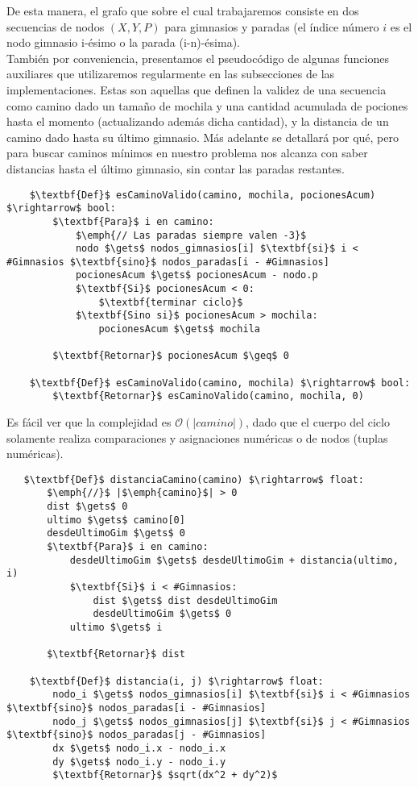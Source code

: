   De esta manera, el grafo que sobre el cual trabajaremos consiste en dos secuencias de nodos $(X, Y, P)$ para gimnasios y paradas (el índice número $i$ es el nodo gimnasio i-ésimo o la parada (i-n)-ésima).
   \\

   También por conveniencia, presentamos el pseudocódigo de algunas funciones auxiliares que utilizaremos regularmente en las subsecciones de las implementaciones. Estas son aquellas que definen la validez de una secuencia como camino dado un tamaño de mochila y una cantidad acumulada de pociones hasta el momento (actualizando además dicha cantidad), y la distancia de un camino dado hasta su último gimnasio. Más adelante se detallará por qué, pero para buscar caminos mínimos en nuestro problema nos alcanza con saber distancias hasta el último gimnasio, sin contar las paradas restantes.
   \\

   \begin{lstlisting}
    $\textbf{Def}$ esCaminoValido(camino, mochila, pocionesAcum) $\rightarrow$ bool:
        $\textbf{Para}$ i en camino:
            $\emph{// Las paradas siempre valen -3}$
            nodo $\gets$ nodos_gimnasios[i] $\textbf{si}$ i < #Gimnasios $\textbf{sino}$ nodos_paradas[i - #Gimnasios]
            pocionesAcum $\gets$ pocionesAcum - nodo.p
            $\textbf{Si}$ pocionesAcum < 0:
                $\textbf{terminar ciclo}$
            $\textbf{Sino si}$ pocionesAcum > mochila:
                pocionesAcum $\gets$ mochila

        $\textbf{Retornar}$ pocionesAcum $\geq$ 0

    $\textbf{Def}$ esCaminoValido(camino, mochila) $\rightarrow$ bool:
        $\textbf{Retornar}$ esCaminoValido(camino, mochila, 0)
   \end{lstlisting}

   Es fácil ver que la complejidad es $\mathcal{O}(|camino|)$, dado que el cuerpo del ciclo solamente realiza comparaciones y asignaciones numéricas o de nodos (tuplas numéricas).

   \begin{lstlisting}
   $\textbf{Def}$ distanciaCamino(camino) $\rightarrow$ float:
       $\emph{//}$ |$\emph{camino}$| > 0
       dist $\gets$ 0
       ultimo $\gets$ camino[0]
       desdeUltimoGim $\gets$ 0
       $\textbf{Para}$ i en camino:
           desdeUltimoGim $\gets$ desdeUltimoGim + distancia(ultimo, i)
           $\textbf{Si}$ i < #Gimnasios:
               dist $\gets$ dist desdeUltimoGim
               desdeUltimoGim $\gets$ 0
           ultimo $\gets$ i

       $\textbf{Retornar}$ dist

    $\textbf{Def}$ distancia(i, j) $\rightarrow$ float:
        nodo_i $\gets$ nodos_gimnasios[i] $\textbf{si}$ i < #Gimnasios $\textbf{sino}$ nodos_paradas[i - #Gimnasios]
        nodo_j $\gets$ nodos_gimnasios[j] $\textbf{si}$ j < #Gimnasios $\textbf{sino}$ nodos_paradas[j - #Gimnasios]
        dx $\gets$ nodo_i.x - nodo_i.x
        dy $\gets$ nodo_i.y - nodo_i.y
        $\textbf{Retornar}$ $sqrt(dx^2 + dy^2)$
   \end{lstlisting}

